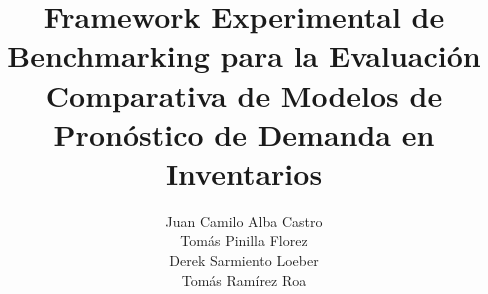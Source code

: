 \documentclass{article}
\title{Framework Experimental de Benchmarking para la Evaluación Comparativa de Modelos de Pronóstico de Demanda en Inventarios}
\author{
\begin{tabular}{c}
    Juan Camilo Alba Castro \\
    Tomás Pinilla Florez \\
    Derek Sarmiento Loeber \\
    Tomás Ramírez Roa
\end{tabular}
}
\begin{document}
    \renewcommand{\contentsname}{TABLA DE CONTENIDO}
    \renewcommand{\listfigurename}{LISTA DE FIGURAS}
    \renewcommand{\listtablename}{LISTA DE TABLAS}
    \def\tablename{Tabla}
    
    
    
    \newpage
    \thispagestyle{empty}
    \mbox{}
    \newpage
    
    
    
    
    
    
    \tableofcontents
    \newpage
    \listoffigures
    \newpage
    \listoftables

    
    
    
    
    
    
    
    
    
    
    
    
\end{document}
